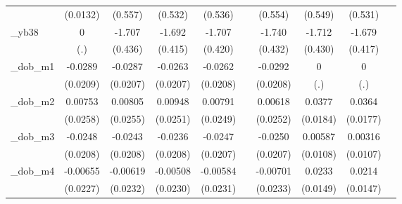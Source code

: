 \begin{table}[htbp]
\begin{tabular}{l*{9}{c}}
            &    (0.0132)         &     (0.557)         &     (0.532)         &     (0.536)         &                     &     (0.554)         &     (0.549)         &     (0.531)         &                     \\
[1em]
\_yb38       &           0         &      -1.707\sym{***}&      -1.692\sym{***}&      -1.707\sym{***}&                     &      -1.740\sym{***}&      -1.712\sym{***}&      -1.679\sym{***}&                     \\
            &         (.)         &     (0.436)         &     (0.415)         &     (0.420)         &                     &     (0.432)         &     (0.430)         &     (0.417)         &                     \\
[1em]
\_dob\_m1     &     -0.0289         &     -0.0287         &     -0.0263         &     -0.0262         &                     &     -0.0292         &           0         &           0         &                     \\
            &    (0.0209)         &    (0.0207)         &    (0.0207)         &    (0.0208)         &                     &    (0.0208)         &         (.)         &         (.)         &                     \\
[1em]
\_dob\_m2     &     0.00753         &     0.00805         &     0.00948         &     0.00791         &                     &     0.00618         &      0.0377\sym{**} &      0.0364\sym{**} &                     \\
            &    (0.0258)         &    (0.0255)         &    (0.0251)         &    (0.0249)         &                     &    (0.0252)         &    (0.0184)         &    (0.0177)         &                     \\
[1em]
\_dob\_m3     &     -0.0248         &     -0.0243         &     -0.0236         &     -0.0247         &                     &     -0.0250         &     0.00587         &     0.00316         &                     \\
            &    (0.0208)         &    (0.0208)         &    (0.0208)         &    (0.0207)         &                     &    (0.0207)         &    (0.0108)         &    (0.0107)         &                     \\
[1em]
\_dob\_m4     &    -0.00655         &    -0.00619         &    -0.00508         &    -0.00584         &                     &    -0.00701         &      0.0233         &      0.0214         &                     \\
            &    (0.0227)         &    (0.0232)         &    (0.0230)         &    (0.0231)         &                     &    (0.0233)         &    (0.0149)         &    (0.0147)         &                     \\

\end{tabular}
\end{table}
